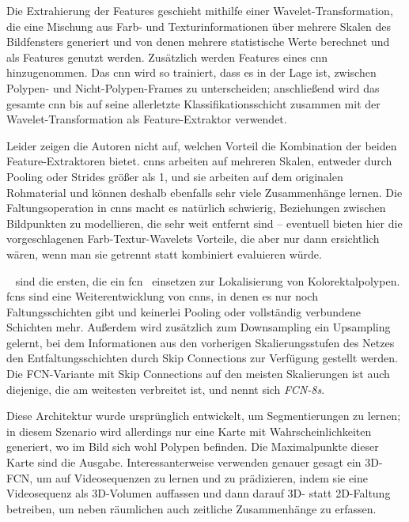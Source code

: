 Die Extrahierung der Features geschieht mithilfe einer Wavelet-Transformation, die eine Mischung aus Farb- und Texturinformationen über mehrere Skalen des Bildfensters generiert und von denen mehrere statistische Werte berechnet und als Features genutzt werden.
Zusätzlich werden Features eines \gls{cnn} hinzugenommen.
Das \gls{cnn} wird so trainiert, dass es in der Lage ist, zwischen Polypen- und Nicht-Polypen-Frames zu unterscheiden; anschließend wird das gesamte \gls{cnn} bis auf seine allerletzte Klassifikationsschicht zusammen mit der Wavelet-Transformation als Feature-Extraktor verwendet.

Leider zeigen die Autoren nicht auf, welchen Vorteil die Kombination der beiden Feature-Extraktoren bietet.
\glspl{cnn} arbeiten auf mehreren Skalen, entweder durch Pooling oder Strides größer als 1, und sie arbeiten auf dem originalen Rohmaterial und können deshalb ebenfalls sehr viele Zusammenhänge lernen.
Die Faltungsoperation in \glspl{cnn} macht es natürlich schwierig, Beziehungen zwischen Bildpunkten zu modellieren, die sehr weit entfernt sind -- eventuell bieten hier die vorgeschlagenen Farb-Textur-Wavelets Vorteile, die aber nur dann ersichtlich wären, wenn man sie getrennt statt kombiniert evaluieren würde.

\citeauthor{Lequan.2017}~\cite{Lequan.2017} sind die ersten, die ein \gls{fcn}~\cite{Long.2015} einsetzen zur Lokalisierung von Kolorektalpolypen.
\glspl{fcn} sind eine Weiterentwicklung von \glspl{cnn}, in denen es nur noch Faltungsschichten gibt und keinerlei Pooling oder vollständig verbundene Schichten mehr.
Außerdem wird zusätzlich zum Downsampling ein Upsampling gelernt, bei dem Informationen aus den vorherigen Skalierungsstufen des Netzes den Entfaltungsschichten durch Skip Connections zur Verfügung gestellt werden.
Die FCN-Variante mit Skip Connections auf den meisten Skalierungen ist auch diejenige, die am weitesten verbreitet ist, und nennt sich \emph{FCN-8s}.

Diese Architektur wurde ursprünglich entwickelt, um Segmentierungen zu lernen; in diesem Szenario wird allerdings nur eine Karte mit Wahrscheinlichkeiten generiert, wo im Bild sich wohl Polypen befinden.
Die Maximalpunkte dieser Karte sind die Ausgabe.
Interessanterweise verwenden \citeauthor{Lequan.2017} genauer gesagt ein 3D-FCN, um auf Videosequenzen zu lernen und zu prädizieren, indem sie eine Videosequenz als 3D-Volumen auffassen und dann darauf 3D- statt 2D-Faltung betreiben, um neben räumlichen auch zeitliche Zusammenhänge zu erfassen.



